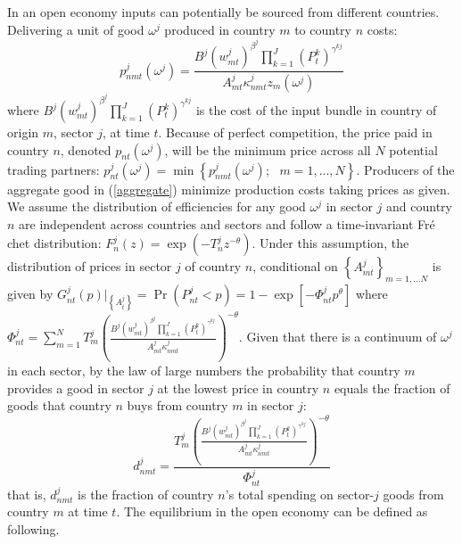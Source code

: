 \documentclass[12pt]{article}
\begin{document}
In an open economy inputs can potentially be sourced from different
countries. Delivering a unit of good $\omega ^{j}$ produced in country $m$
to country $n$ costs: 
\begin{equation*}
p_{nmt}^{j}(\omega ^{j})=\frac{B^{j}\left( w_{mt}^{j}\right) ^{\beta
^{j}}\prod_{k=1}^{J}(P_{t}^{k})^{\gamma ^{kj}}}{A_{mt}^{j}\kappa
_{nmt}^{j}z_{m}(\omega ^{j})}
\end{equation*}%
where $B^{j}\left( w_{mt}^{j}\right) ^{\beta
^{j}}\prod_{k=1}^{J}(P_{t}^{k})^{\gamma ^{kj}}$ is the cost of the input
bundle in country of origin $m$, sector $j$, at time $t$. Because of perfect
competition, the price paid in country $n$, denoted $p_{nt}(\omega ^{j})$,
will be the minimum price across all $N$ potential trading partners: $%
p_{nt}^{j}(\omega ^{j})=\min \left\{ p_{nmt}^{j}(\omega ^{j});\text{ }%
m=1,...,N\right\} .$ Producers of the aggregate good in (\ref{aggregate})
minimize production costs taking prices as given. We assume the distribution
of efficiencies for any good $\omega ^{j}$ in sector $j$ and country $n$ are
independent across countries and sectors and follow a time-invariant Fr\'{e}%
chet distribution: $F_{n}^{j}(z)=\exp (-T_{n}^{j}z^{-\theta }).$ Under this
assumption, the distribution of prices in sector $j$ of country $n$,
conditional on $\left\{ A_{mt}^{j}\right\} _{m=1,...N}$ is given by $%
G_{nt}^{j}(p)|_{\left\{ A_{t}^{j}\right\} }=\Pr (P_{nt}^{j}<p)=1-\exp \left[
-\Phi _{nt}^{j}p^{\theta }\right] $ where $\Phi
_{nt}^{j}=\sum_{m=1}^{N}T_{m}^{j}\left( \frac{B^{j}\left( w_{mt}^{j}\right)
^{\beta ^{j}}\prod_{k=1}^{J}(P_{t}^{k})^{\gamma ^{kj}}}{A_{mt}^{j}\kappa
_{nmt}^{j}}\right) ^{-\theta }$. Given that there is a continuum of $\omega
^{j}$ in each sector, by the law of large numbers the probability that
country $m$ provides a good in sector $j$ at the lowest price in country $n$
equals the fraction of goods that country $n$ buys from country $m$ in
sector $j$: 
\begin{equation}
d_{nmt}^{j}=\frac{T_{m}^{j}\left( \frac{B^{j}\left( w_{mt}^{j}\right)
^{\beta ^{j}}\prod_{k=1}^{J}(P_{t}^{k})^{\gamma ^{kj}}}{A_{mt}^{j}\kappa
_{nmt}^{j}}\right) ^{-\theta }}{\Phi _{nt}^{j}}  \label{shares}
\end{equation}%
that is, $d_{nmt}^{j}$ is the fraction of country $n$'s total spending on
sector-$j$ goods from country $m$ at time $t$. The equilibrium in the open
economy can be defined as following.
\end{document}
